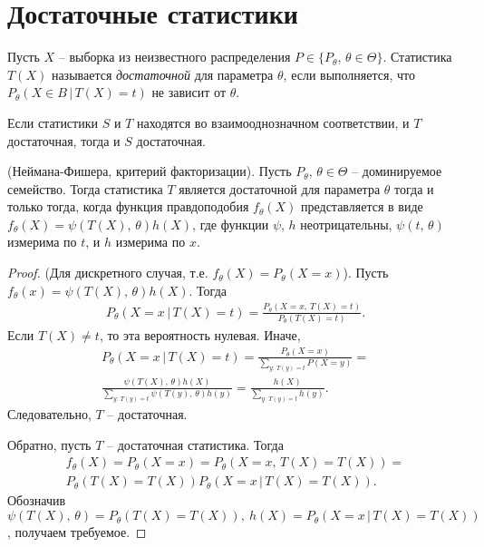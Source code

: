     \section{Достаточные статистики}
    
    \begin{definition}
        Пусть $X$ -- выборка из неизвестного распределения $P \in \{P_\theta,\, \theta \in \Theta\}$. Статистика $T(X)$ называется \textit{достаточной} для параметра $\theta$, если выполняется, что $P_\theta(X \in B\, \vert\, T(X) = t)$ не зависит от $\theta$.
    \end{definition}
    
    \begin{note}
        Если статистики $S$ и $T$ находятся во взаимооднозначном соответствии, и $T$ достаточная, тогда и $S$ достаточная.
    \end{note}
    
    \begin{theorem} 
        (Неймана-Фишера, критерий факторизации). Пусть ${P_\theta,\, \theta \in \Theta}$ -- доминируемое семейство. Тогда статистика $T$ является достаточной для параметра $\theta$ тогда и только тогда, когда функция правдоподобия $f_\theta(X)$ представляется в виде $f_\theta(X) = \psi(T(X),\, \theta)h(X)$, где функции $\psi,\, h$ неотрицательны, $\psi(t,\, \theta)$ измерима по $t$, и $h$ измерима по $x$.
    \end{theorem}
    
    \begin{proof}
        (Для дискретного случая, т.е. $f_\theta(X) = P_\theta(X = x)$). Пусть $f_\theta(x) = \psi(T(X),\, \theta)h(X)$. Тогда 
        \begin{gather*}
            P_\theta(X = x\, \vert\, T(X) = t) = \frac{P_\theta(X = x,\, T(X) = t)}{P_\theta(T(X) = t)}.
        \end{gather*}
        Если $T(X) \ne t$, то эта вероятность нулевая. Иначе,
        \begin{gather*}
            P_\theta(X = x\, \vert\, T(X) = t) = \frac{P_\theta (X = x)}{\sum_{y:\, T(y) = t}P(X = y)} =\\ \frac{\psi(T(X),\, \theta)h(X)}{\sum_{y:\, T(y) = t}\psi(T(y),\, \theta)h(y)} = \frac{h(X)}{\sum_{y:\, T(y) = t}h(y)}.
        \end{gather*}
        Следовательно, $T$ -- достаточная.
        
        Обратно, пусть $T$ -- достаточная статистика. Тогда
        \begin{gather*}
            f_\theta(X)=P_\theta(X = x) = P_\theta(X = x,\, T(X) = T(X)) =\\ P_\theta(T(X) = T(X))P_\theta(X = x\, \vert\, T(X) = T(X)).
        \end{gather*}
        Обозначив $\psi(T(X),\, \theta) = P_\theta(T(X) = T(X)),\ h(X) = P_\theta(X = x\, \vert\, T(X) = T(X))$, получаем требуемое.
    \end{proof}
    
